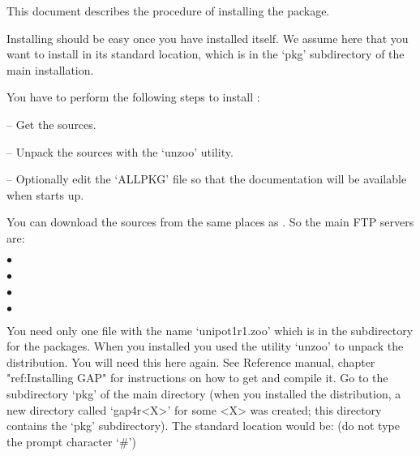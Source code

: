 

This document describes the procedure of installing the package.

Installing {\Unipot} should  be  easy  once  you  have  installed  {\GAP}
itself. We assume here that you want to install {\Unipot} in its standard
location,  which  is  in  the  `pkg'  subdirectory  of the  main  {}
installation.


\null

You have to perform the following steps to install {\Unipot}:

\beginlist%
\item{--} Get the sources.
\item{--} Unpack the sources with the `unzoo' utility.
\item{--} Optionally edit the `ALLPKG' file so that the {\Unipot}
     documentation will be available when {\GAP} starts up.
\endlist                                                                                                      



You can download the sources  from the same places as {\GAP}. So the main
FTP servers are:

\beginlist%
\item{$\bullet$}
\item{$\bullet$}
\item{$\bullet$}
\item{$\bullet$}
\endlist

You  need  only one  file with the name `unipot1r1.zoo'  which  is in the
subdirectory for the packages.  When  you  installed  {\GAP} you used the
utility  `unzoo'  to unpack the  distribution.  You  will  need this here
again.  See  {\GAP}  Reference manual, chapter "ref:Installing  GAP"  for
instructions on how to  get and compile it.  Go to the subdirectory `pkg'
of the main {\GAP} directory (when you installed the {\GAP} distribution,
a new  directory  called  `gap4r<X>'  for  some  <X>  was  created;  this
directory contains the `pkg'  subdirectory). The standard  location would
be: (do not type the prompt character `\#')

